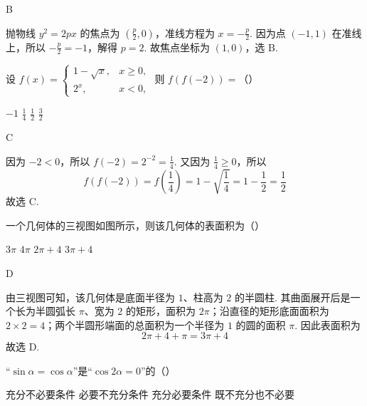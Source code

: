 \begin{answer}
B
\end{answer}

\begin{solution}
抛物线 \(y^2=2px\) 的焦点为 \(\left(\frac{p}{2},0\right)\)，准线方程为 \(x=-\frac{p}{2}\). 因为点 \((-1,1)\) 在准线上，所以 \(-\frac{p}{2}=-1\)，解得 \(p=2\). 故焦点坐标为 \((1,0)\)，选 B.
\end{solution}

\begin{problem}
设 \(f(x) = \begin{cases}
1 - \sqrt{x}, & x \geqslant 0,\\
2^x, & x < 0,
\end{cases}\) 则 \(f(f(-2)) =\)（\quad）

\choices
    {\(-1\)}
    {\(\frac{1}{4}\)}
    {\(\frac{1}{2}\)}
    {\(\frac{3}{2}\)}
\end{problem}

\begin{answer}
C
\end{answer}

\begin{solution}
因为 \(-2<0\)，所以 \(f(-2)=2^{-2}=\frac{1}{4}\). 又因为 \(\frac{1}{4}\geqslant0\)，所以
\[
f\left(f(-2)\right)=f\left(\frac{1}{4}\right)=1-\sqrt{\frac{1}{4}}=1-\frac{1}{2}=\frac{1}{2}
\]
故选 C.
\end{solution}

\begin{problem}
一个几何体的三视图如图所示，则该几何体的表面积为（\quad）


\choices
    {\(3\pi\)}
    {\(4\pi\)}
    {\(2\pi + 4\)}
    {\(3\pi + 4\)}
\end{problem}

\begin{answer}
D
\end{answer}

\begin{solution}
由三视图可知，该几何体是底面半径为 \(1\)、柱高为 \(2\) 的半圆柱. 其曲面展开后是一个长为半圆弧长 \(\pi\)、宽为 \(2\) 的矩形，面积为 \(2\pi\)；沿直径的矩形底面面积为 \(2\times2=4\)；两个半圆形端面的总面积为一个半径为 \(1\) 的圆的面积 \(\pi\). 因此表面积为
\[
2\pi+4+\pi=3\pi+4
\]
故选 D.
\end{solution}

\begin{problem}
“\(\sin \alpha = \cos \alpha\)”是“\(\cos 2\alpha = 0\)”的（\quad）

\choices
    {充分不必要条件}
    {必要不充分条件}
    {充分必要条件}
    {既不充分也不必要}
\end{problem}


